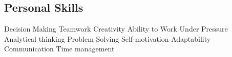 \documentclass[]{aj-resume-openfont}
\begin{document}
\begin{minipage}[t]{0.33\textwidth}
\subsection{Personal Skills}
\textbullet{}Decision Making \textbullet{}Teamwork \textbullet{}Creativity \textbullet{}Ability to Work Under Pressure \textbullet{}Analytical thinking \textbullet{}Problem Solving \textbullet{}Self-motivation  \textbullet{}Adaptability \textbullet{}Communication
\textbullet{}Time management %
\sectionsep

%
%

\end{minipage} 
\hfill
\end{document}
